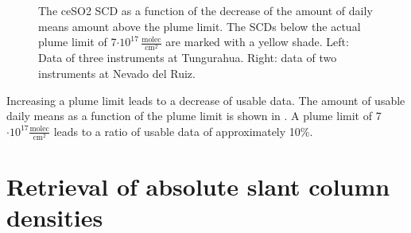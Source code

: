 \begin{figure}
	\centering
	\caption[The ce{SO2} SCD  as a function of the decrease of the amount of daily means amount above the plume limit. Data of Tungurahua and Nevado del Ruiz.]{The ce{SO2} SCD  as a function of the decrease of the amount of daily means amount above the plume limit. The  SCDs below the actual plume limit of 7$\cdot10^{17}\,\frac{\text{molec}}{\text{cm}^2}$ are marked with a yellow shade. Left: Data of three instruments at Tungurahua. Right: data of two instruments at Nevado del Ruiz.}
	\label{fig:percentageminso2}
\end{figure}
Increasing a plume limit leads to a decrease of usable data. The amount of usable  daily means as a function of the plume limit is shown in . A plume limit of 7$\cdot10^{17}\frac{\text{molec}}{\text{cm}^2}$ leads to a ratio of usable data of approximately 10\%.


\section{Retrieval of absolute slant column densities\label{Chap:Cont}}

